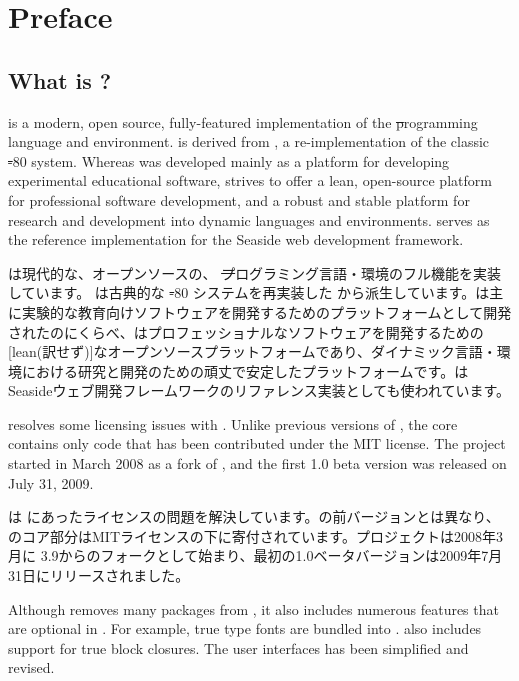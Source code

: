 \documentclass[a4paper,10pt,twoside]{book}
\begin{document}
	\sloppy
	\frontmatter
\fi
\chapter{Preface}

\section*{What is \pharo?}

\pharo is a modern, open source, fully-featured implementation of the \st programming language and environment. \pharo is derived from \squeak\cite{Inga97a}, a re-implementation of the classic \st-80 system. Whereas \squeak was developed mainly as a platform for developing experimental educational software, \pharo strives to offer a lean, open-source platform for professional software development, and a robust and stable platform for research and development into dynamic languages and environments. \pharo serves as the reference implementation for the Seaside web development framework.

\pharo は現代的な、オープンソースの、 \st プログラミング言語・環境のフル機能を実装しています。 \pharo は古典的な \st-80 システムを再実装した \squeak\cite{Inga97a}から派生しています。\squeak は主に実験的な教育向けソフトウェアを開発するためのプラットフォームとして開発されたのにくらべ、\pharo はプロフェッショナルなソフトウェアを開発するための[lean(訳せず)]なオープンソースプラットフォームであり、ダイナミック言語・環境における研究と開発のための頑丈で安定したプラットフォームです。\pharo はSeasideウェブ開発フレームワークのリファレンス実装としても使われています。

\pharo resolves some licensing issues with \squeak. Unlike previous versions of \squeak, the \pharo core contains only code that has been contributed under the MIT license. The \pharo project started in March 2008 as a fork of , and the first 1.0 beta version was released on July 31, 2009.

\pharo は \squeak にあったライセンスの問題を解決しています。\squeak の前バージョンとは異なり、\pharo のコア部分はMITライセンスの下に寄付されています。\pharo プロジェクトは2008年3月に \squeak 3.9からのフォークとして始まり、最初の1.0ベータバージョンは2009年7月31日にリリースされました。

Although \pharo removes many packages from \squeak, it also includes numerous features that are optional in \squeak. For example, true type fonts are bundled into \pharo. \pharo also includes support for true block closures. The user interfaces has been simplified and revised.
\end{document}
